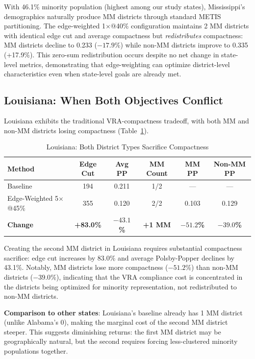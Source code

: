 With 46.1\% minority population (highest among our study states), Mississippi's demographics naturally produce MM districts through standard METIS partitioning. The edge-weighted 1$\times$@40\% configuration maintains 2 MM districts with identical edge cut and average compactness but \emph{redistributes} compactness: MM districts decline to 0.233 ($-17.9$\%) while non-MM districts improve to 0.335 (+17.9\%). This zero-sum redistribution occurs despite no net change in state-level metrics, demonstrating that edge-weighting can optimize district-level characteristics even when state-level goals are already met.

\subsection{Louisiana: When Both Objectives Conflict}

Louisiana exhibits the traditional VRA-compactness tradeoff, with both MM and non-MM districts losing compactness (Table~\ref{tab:louisiana-analysis}).

\begin{table}[htbp]
\centering
\caption{Louisiana: Both District Types Sacrifice Compactness}
\label{tab:louisiana-analysis}
\begin{tabular}{lccccc}
\toprule
\textbf{Method} & \textbf{Edge Cut} & \textbf{Avg PP} & \textbf{MM Count} & \textbf{MM PP} & \textbf{Non-MM PP} \\
\midrule
Baseline        & 194 & 0.211 & 1/2 & --- & --- \\
Edge-Weighted 5$\times$@45\% & 355 & 0.120 & 2/2 & 0.103 & 0.129 \\
\textbf{Change} & \textbf{+83.0\%} & \textbf{$-43.1$\%} & \textbf{+1 MM} & \textbf{$-51.2$\%} & \textbf{$-39.0$\%} \\
\bottomrule
\end{tabular}
\end{table}

Creating the second MM district in Louisiana requires substantial compactness sacrifice: edge cut increases by 83.0\% and average Polsby-Popper declines by 43.1\%. Notably, MM districts lose more compactness ($-51.2$\%) than non-MM districts ($-39.0$\%), indicating that the VRA compliance cost is concentrated in the districts being optimized for minority representation, not redistributed to non-MM districts.

\textbf{Comparison to other states}: Louisiana's baseline already has 1 MM district (unlike Alabama's 0), making the marginal cost of the second MM district steeper. This suggests diminishing returns: the first MM district may be geographically natural, but the second requires forcing less-clustered minority populations together.

